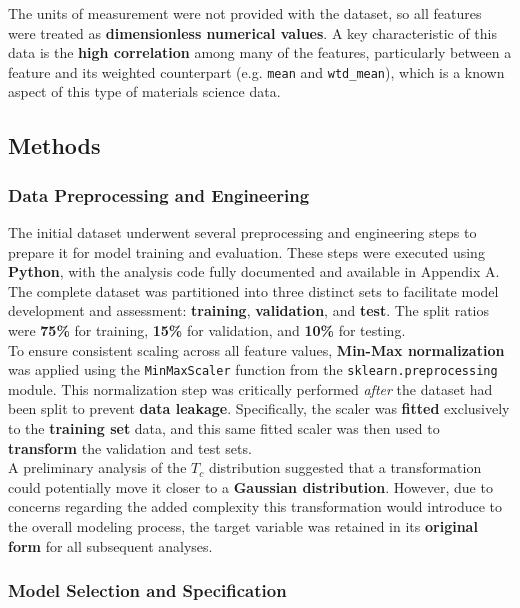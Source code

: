 \documentclass[conference]{IEEEtran}
\begin{document}
The units of measurement were not provided with the dataset, so all features were treated as \textbf{dimensionless numerical values}. A key characteristic of this data is the \textbf{high correlation} among many of the features, particularly between a feature and its weighted counterpart (e.g. \texttt{mean} and \texttt{wtd\_mean}), which is a known aspect of this type of materials science data.

\subsection{\textbf{Methods}}

\subsubsection{\textbf{Data Preprocessing and Engineering}}
The initial dataset underwent several preprocessing and engineering steps to prepare it for model training and evaluation. These steps were executed using \textbf{Python}, with the analysis code fully documented and available in Appendix A.\\
\indent The complete dataset was partitioned into three distinct sets to facilitate model development and assessment: \textbf{training}, \textbf{validation}, and \textbf{test}. The split ratios were \textbf{75\%} for training, \textbf{15\%} for validation, and \textbf{10\%} for testing.\\
\indent To ensure consistent scaling across all feature values, \textbf{Min-Max normalization} was applied using the  \texttt{MinMaxScaler} function from the  \texttt{sklearn.preprocessing} module. This normalization step was critically performed \textit{after} the dataset had been split to prevent \textbf{data leakage}. Specifically, the scaler was \textbf{fitted} exclusively to the \textbf{training set} data, and this same fitted scaler was then used to \textbf{transform} the validation and test sets.\\
\indent A preliminary analysis of the $T_c$ distribution suggested that a transformation could potentially move it closer to a \textbf{Gaussian distribution}. However, due to concerns regarding the added complexity this transformation would introduce to the overall modeling process, the target variable was retained in its \textbf{original form} for all subsequent analyses.\\
\subsubsection{\textbf{Model Selection and Specification}}
\end{document}
